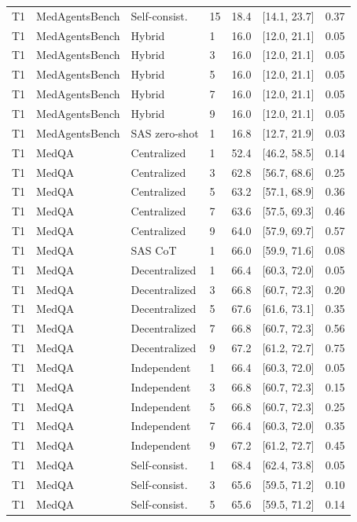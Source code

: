 \begin{table}[t]
\begin{tabular}{@{}llllrrr@{}}
T1 & MedAgentsBench & Self-consist. & 15 & 18.4 & [14.1, 23.7] & 0.37 \\
T1 & MedAgentsBench & Hybrid & 1 & 16.0 & [12.0, 21.1] & 0.05 \\
T1 & MedAgentsBench & Hybrid & 3 & 16.0 & [12.0, 21.1] & 0.05 \\
T1 & MedAgentsBench & Hybrid & 5 & 16.0 & [12.0, 21.1] & 0.05 \\
T1 & MedAgentsBench & Hybrid & 7 & 16.0 & [12.0, 21.1] & 0.05 \\
T1 & MedAgentsBench & Hybrid & 9 & 16.0 & [12.0, 21.1] & 0.05 \\
T1 & MedAgentsBench & SAS zero-shot & 1 & 16.8 & [12.7, 21.9] & 0.03 \\
T1 & MedQA & Centralized & 1 & 52.4 & [46.2, 58.5] & 0.14 \\
T1 & MedQA & Centralized & 3 & 62.8 & [56.7, 68.6] & 0.25 \\
T1 & MedQA & Centralized & 5 & 63.2 & [57.1, 68.9] & 0.36 \\
T1 & MedQA & Centralized & 7 & 63.6 & [57.5, 69.3] & 0.46 \\
T1 & MedQA & Centralized & 9 & 64.0 & [57.9, 69.7] & 0.57 \\
T1 & MedQA & SAS CoT & 1 & 66.0 & [59.9, 71.6] & 0.08 \\
T1 & MedQA & Decentralized & 1 & 66.4 & [60.3, 72.0] & 0.05 \\
T1 & MedQA & Decentralized & 3 & 66.8 & [60.7, 72.3] & 0.20 \\
T1 & MedQA & Decentralized & 5 & 67.6 & [61.6, 73.1] & 0.35 \\
T1 & MedQA & Decentralized & 7 & 66.8 & [60.7, 72.3] & 0.56 \\
T1 & MedQA & Decentralized & 9 & 67.2 & [61.2, 72.7] & 0.75 \\
T1 & MedQA & Independent & 1 & 66.4 & [60.3, 72.0] & 0.05 \\
T1 & MedQA & Independent & 3 & 66.8 & [60.7, 72.3] & 0.15 \\
T1 & MedQA & Independent & 5 & 66.8 & [60.7, 72.3] & 0.25 \\
T1 & MedQA & Independent & 7 & 66.4 & [60.3, 72.0] & 0.35 \\
T1 & MedQA & Independent & 9 & 67.2 & [61.2, 72.7] & 0.45 \\
T1 & MedQA & Self-consist. & 1 & 68.4 & [62.4, 73.8] & 0.05 \\
T1 & MedQA & Self-consist. & 3 & 65.6 & [59.5, 71.2] & 0.10 \\
T1 & MedQA & Self-consist. & 5 & 65.6 & [59.5, 71.2] & 0.14 \\

\end{tabular}
\end{table}
